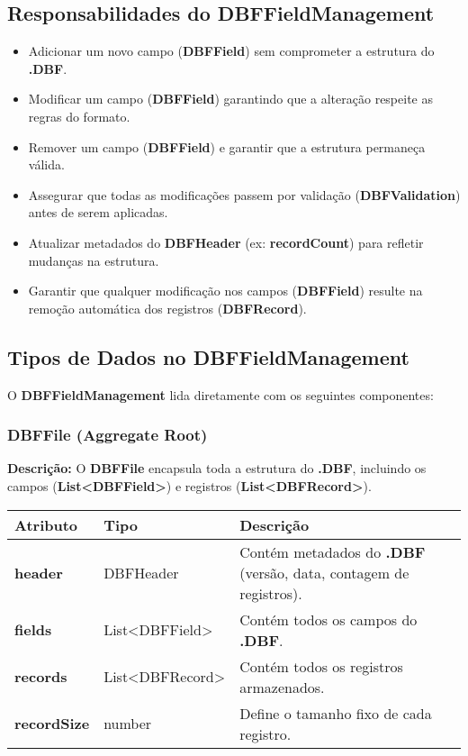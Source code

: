 \subsection{Responsabilidades do DBFFieldManagement}
\begin{itemize}
    \item Adicionar um novo campo (\textbf{DBFField}) sem comprometer a estrutura do \textbf{.DBF}.
    \item Modificar um campo (\textbf{DBFField}) garantindo que a alteração respeite as regras do formato.
    \item Remover um campo (\textbf{DBFField}) e garantir que a estrutura permaneça válida.
    \item Assegurar que todas as modificações passem por validação (\textbf{DBFValidation}) antes de serem aplicadas.
    \item Atualizar metadados do \textbf{DBFHeader} (ex: \textbf{recordCount}) para refletir mudanças na estrutura.
    \item Garantir que qualquer modificação nos campos (\textbf{DBFField}) resulte na remoção automática dos registros (\textbf{DBFRecord}).
\end{itemize}

\subsection{Tipos de Dados no DBFFieldManagement}
O \textbf{DBFFieldManagement} lida diretamente com os seguintes componentes:

\subsubsection{DBFFile (Aggregate Root)}
\textbf{Descrição:} O \textbf{DBFFile} encapsula toda a estrutura do \textbf{.DBF}, incluindo os campos (\textbf{List<DBFField>}) e registros (\textbf{List<DBFRecord>}).

\begin{table}[h]
    \centering
    \begin{tabular}{|l|l|p{10cm}|}
        \hline
        \textbf{Atributo} & \textbf{Tipo} & \textbf{Descrição} \\ \hline
        \textbf{header} & DBFHeader & Contém metadados do \textbf{.DBF} (versão, data, contagem de registros). \\ \hline
        \textbf{fields} & List<DBFField> & Contém todos os campos do \textbf{.DBF}. \\ \hline
        \textbf{records} & List<DBFRecord> & Contém todos os registros armazenados. \\ \hline
        \textbf{recordSize} & number & Define o tamanho fixo de cada registro. \\ \hline
    \end{tabular}
\end{table}

